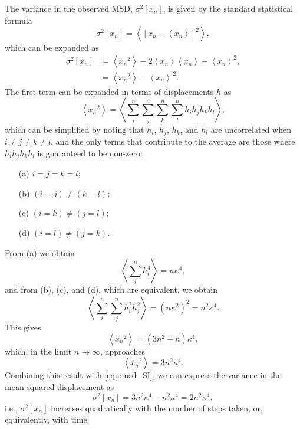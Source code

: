 \documentclass[reprint,superscriptaddress,nobibnotes,amsmath,amssymb,aps,prx,hidelinks]{revtex4-2}
\newcommand{\oMSDn}{\ensuremath{x_n}}
\newcommand{\moMSDn}{\ensuremath{\left<\oMSDn\right>}}
\newcommand{\var}[1]{\ensuremath{\sigma^2[#1]}}
\begin{document}
The variance in the observed MSD, $\var{\oMSDn}$, is given by the standard statistical formula
\begin{equation}
    \var{\oMSDn} = \left<{\left[\oMSDn - \moMSDn\right]}^2\right>,
\end{equation}
which can be expanded as
\begin{equation}
    \begin{aligned}
        \var{\oMSDn} &= \left<\oMSDn^2\right> - 2\moMSDn\left<\oMSDn\right> + \moMSDn^2,\\
                     &= \left<\oMSDn^2\right> - \moMSDn^{\,2}.
    \end{aligned}
\end{equation}
The first term can be expanded in terms of displacements $h$ as
\begin{equation}
  \left<\oMSDn^2\right> = \left<\sum_i^n\sum_j^n\sum_k^n\sum_l^n h_i h_j h_k h_l\right>,
  \label{equ:big_av}
\end{equation}
which can be simplified by noting that $h_i$, $h_j$, $h_k$, and $h_l$ are uncorrelated when $i \neq j \neq k \neq l$, and the only terms that contribute to the average are those where $h_ih_jh_kh_l$ is guaranteed to be non-zero:
\begin{itemize}
    \item[(a)] $i = j = k = l$;
    \item[(b)] $(i = j) \neq (k = l)$;
    \item[(c)] $(i = k) \neq (j = l)$;
    \item[(d)] $(i = l) \neq (j = k)$. 
\end{itemize}
From (a) we obtain
\begin{equation}
    \left<\sum_i^nh_i^4\right> = n\kappa^4,
\end{equation}
and from (b), (c), and (d), which are equivalent, we obtain
\begin{equation}
    \left<\sum_i^n\sum_j^nh_i^2h_j^2\right> = (n\kappa^2)^2 = n^2\kappa^4.
\end{equation}
This gives
\begin{equation}
    \left<\oMSDn^2\right> = (3n^2 + n)\kappa^4,
\end{equation}
which, in the limit $n \to \infty$, approaches
\begin{equation}
    \left<\oMSDn^2\right> = 3n^2\kappa^4.
    \label{equ:infty}
\end{equation}
Combining this result with \cref{equ:msd_SI}, we can express the variance in the mean-squared displacement as
\begin{equation}
    \var{\oMSDn} = 3n^2\kappa^4 - n^2\kappa^4 = 2n^2\kappa^4,
    \label{equ:varmsd}
\end{equation}
i.e., $\var{\oMSDn}$ increases quadratically with the number of steps taken, or, equivalently, with time.
\end{document}
